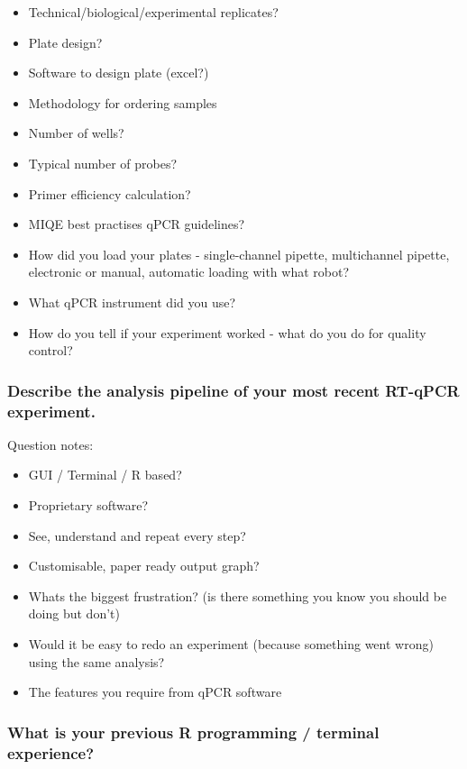 \documentclass[../main.tex]{subfiles}
\begin{document}
\begin{itemize}
    \item Technical/biological/experimental replicates?
    \item Plate design?
    \item Software to design plate (excel?)
    \item Methodology for ordering samples
    \item Number of wells?
    \item Typical number of probes?
    \item Primer efficiency calculation?
    \item MIQE best practises qPCR guidelines?
    \item How did you load your plates - single-channel pipette, multichannel pipette, electronic or manual, automatic loading with what robot?
    \item What qPCR instrument did you use?
    \item How do you tell if your experiment worked - what do you do for quality control?
\end{itemize}

\subsubsection{Describe the analysis pipeline of your most recent RT-qPCR experiment.}

Question notes:

\begin{itemize}
    \item GUI / Terminal / R based?
    \item Proprietary software?
    \item See, understand and repeat every step?
    \item Customisable, paper ready output graph?
    \item Whats the biggest frustration? (is there something you know you should be doing but don’t)
    \item Would it be easy to redo an experiment (because something went wrong) using the same analysis?
    \item The features you require from qPCR software
\end{itemize}

\subsubsection{What is your previous R programming / terminal experience?}
\end{document}
